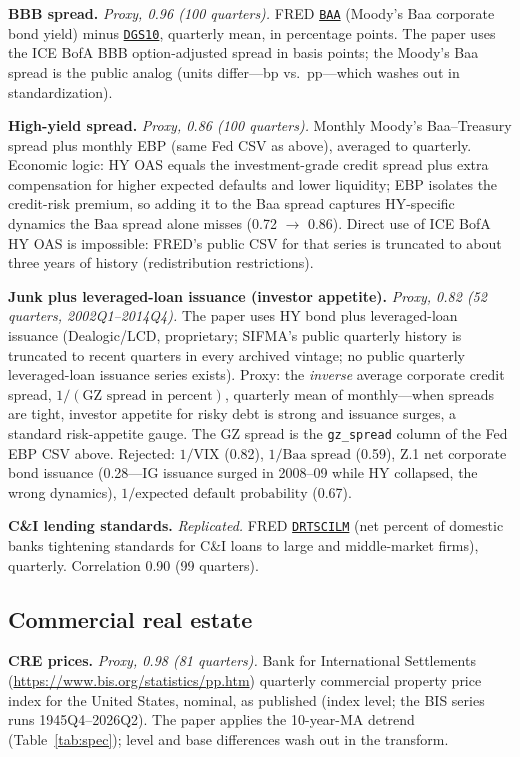 \documentclass[11pt]{article}
\newcommand{\fred}[1]{\href{https://fred.stlouisfed.org/series/#1}{\texttt{#1}}}
\begin{document}
\textbf{BBB spread.} \textit{Proxy, 0.96 (100 quarters).} FRED
\fred{BAA} (Moody's Baa corporate bond yield) minus \fred{DGS10},
quarterly mean, in percentage points.  The paper uses the ICE BofA BBB
option-adjusted spread in basis points; the Moody's Baa spread is the
public analog (units differ---bp vs.\ pp---which washes out in
standardization).

\textbf{High-yield spread.} \textit{Proxy, 0.86 (100 quarters).}
Monthly Moody's Baa--Treasury spread plus monthly EBP (same Fed CSV as
above), averaged to quarterly.  Economic logic: HY OAS equals the
investment-grade credit spread plus extra compensation for higher
expected defaults and lower liquidity; EBP isolates the credit-risk
premium, so adding it to the Baa spread captures HY-specific dynamics
the Baa spread alone misses (0.72 $\to$ 0.86).  Direct use of ICE BofA HY
OAS is impossible: FRED's public CSV for that series is truncated to
about three years of history (redistribution restrictions).

\textbf{Junk plus leveraged-loan issuance (investor appetite).}
\textit{Proxy, 0.82 (52 quarters, 2002Q1--2014Q4).} The paper uses HY
bond plus leveraged-loan issuance (Dealogic/LCD, proprietary; SIFMA's
public quarterly history is truncated to recent quarters in every
archived vintage; no public quarterly leveraged-loan issuance series
exists).  Proxy: the \textit{inverse} average corporate credit spread,
$1/(\text{GZ spread in percent})$, quarterly mean of monthly---when
spreads are tight, investor appetite for risky debt is strong and
issuance surges, a standard risk-appetite gauge.  The GZ spread is the
\texttt{gz\_spread} column of the Fed EBP CSV above.  Rejected:
$1/\text{VIX}$ (0.82), $1/\text{Baa spread}$ (0.59), Z.1 net corporate
bond issuance (0.28---IG issuance surged in 2008--09 while HY collapsed,
the wrong dynamics), $1/\text{expected default probability}$ (0.67).

\textbf{C\&I lending standards.} \textit{Replicated.} FRED
\fred{DRTSCILM} (net percent of domestic banks tightening standards
for C\&I loans to large and middle-market firms), quarterly.
Correlation 0.90 (99 quarters).

\subsection{Commercial real estate}

\textbf{CRE prices.} \textit{Proxy, 0.98 (81 quarters).} Bank for
International Settlements
(\url{https://www.bis.org/statistics/pp.htm}) quarterly commercial
property price index for
the United States, nominal, as published (index level; the BIS series
runs 1945Q4--2026Q2).  The paper applies the 10-year-MA detrend
(Table~\ref{tab:spec}); level and base differences wash out in the
transform.
\end{document}
